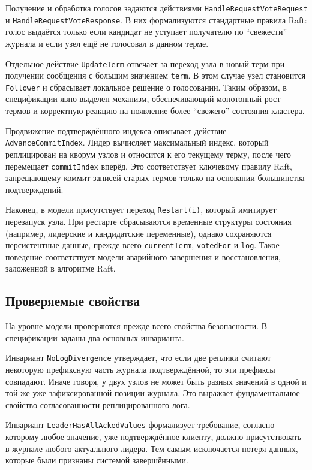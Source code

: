 Получение и обработка голосов задаются действиями
\texttt{HandleRequestVoteRequest} и \texttt{HandleRequestVoteResponse}. В них
формализуются стандартные правила Raft: голос выдаётся только если кандидат не
уступает получателю по ``свежести'' журнала и если узел ещё не голосовал в
данном терме.

Отдельное действие \texttt{UpdateTerm} отвечает за переход узла в новый терм при
получении сообщения с большим значением \texttt{term}. В этом случае узел
становится \texttt{Follower} и сбрасывает локальное решение о голосовании.
Таким образом, в спецификации явно выделен механизм, обеспечивающий монотонный
рост термов и корректную реакцию на появление более ``свежего'' состояния
кластера.

Продвижение подтверждённого индекса описывает действие
\texttt{AdvanceCommitIndex}. Лидер вычисляет максимальный индекс, который
реплицирован на кворум узлов и относится к его текущему терму, после чего
перемещает \texttt{commitIndex} вперёд. Это соответствует ключевому правилу
Raft, запрещающему коммит записей старых термов только на основании большинства
подтверждений.

Наконец, в модели присутствует переход \texttt{Restart(i)}, который имитирует
перезапуск узла. При рестарте сбрасываются временные структуры состояния
(например, лидерские и кандидатские переменные), однако сохраняются
персистентные данные, прежде всего \texttt{currentTerm}, \texttt{votedFor} и
\texttt{log}. Такое поведение соответствует модели аварийного завершения и
восстановления, заложенной в алгоритме Raft.

\subsection{Проверяемые свойства}

На уровне модели проверяются прежде всего свойства безопасности. В
спецификации заданы два основных инварианта.

Инвариант \texttt{NoLogDivergence} утверждает, что если две реплики считают
некоторую префиксную часть журнала подтверждённой, то эти префиксы совпадают.
Иначе говоря, у двух узлов не может быть разных значений в одной и той же уже
зафиксированной позиции журнала. Это выражает фундаментальное свойство
согласованности реплицированного лога.

Инвариант \texttt{LeaderHasAllAckedValues} формализует требование, согласно
которому любое значение, уже подтверждённое клиенту, должно присутствовать в
журнале любого актуального лидера. Тем самым исключается потеря данных,
которые были признаны системой завершёнными.

